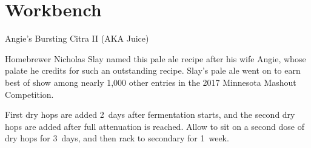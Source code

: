 \documentclass[9pt,oneside]{scrbook}
\begin{document}
\mainmatter
\twocolumn

\part{Workbench}

\begin{recipie}{Angie's Bursting Citra II (AKA Juice)}

\begin{aboutblock}
Homebrewer Nicholas Slay named this pale ale recipe after his wife Angie, whose
palate he credits for such an outstanding recipe. Slay's pale ale went on to earn
best of show among nearly 1,000 other entries in the 2017 Minnesota Mashout
Competition.
\end{aboutblock}


\begin{methodandtiming}
 
\begin{mashsteps}
\end{mashsteps}

\begin{fermentationsteps}
\end{fermentationsteps}

\begin{directions}
First dry hops are added 2~days after fermentation starts, and the
second dry hops are added after full attenuation is reached. Allow
to sit on a second dose of dry hops for 3~days, and then rack to
secondary for 1~week.
\end{directions}

\end{methodandtiming}

\pagebreak

\begin{ingredientsblock}

\begin{malts}
\end{malts}

\begin{hops}
\end{hops}

\begin{yeasts}
\end{yeasts}

\end{ingredientsblock}

\end{recipie}

\backmatter


\end{document}
